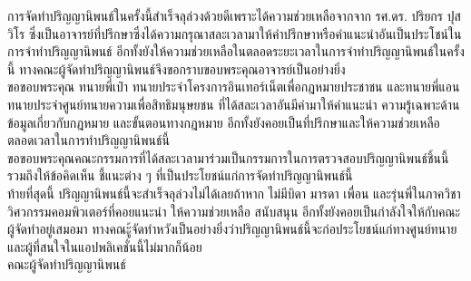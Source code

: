 \documentclass[12pt,oneside,openright,a4paper]{cpe-thai-project}
\begin{document}
\preface
\hspace*{1cm} การจัดทำปริญญานิพนธ์ในครั้งนี้สำเร็จลุล่วงด้วยดีเพราะได้ความช่วยเหลือจากจาก รศ.ดร. ปริยกร ปุสวิโร ซึ่งเป็นอาจารย์ที่ปรึกษาซึ่งได้ความกรุณาสละเวลามาให้คำปรึกษาหรือคำแนะนำอันเป็นประโชน์ในการจำทำปริญญานิพนธ์ อีกทั้งยังให้ความช่วยเหลือในตลอดระยะเวลาในการจำทำปริญญานิพนธ์ในครั้งนี้ ทางคณะผู้จัดทำปริญญานิพนธ์จึงขอกราบขอบพระคุณอาจารย์เป็นอย่างยิ่ง \\
\hspace*{1cm}ขอขอบพระคุณ ทนายพี่เป๋า ทนายประจำโครงการอินเทอร์เน็ตเพื่อกฎหมายประชาชน และทนายพี่แอน ทนายประจำศูนย์ทนายความเพื่อสิทธิมนุษยชน ที่ได้สละเวลาอันมีค่ามาให้คำแนะนำ ความรู้เฉพาะด้าน ข้อมูลเกี่ยวกับกฎหมาย และขั้นตอนทางกฎหมาย อีกทั้งยังคอยเป็นที่ปรึกษาและให้ความช่วยเหลือตลอดเวลาในการทำปริญญานิพนธ์นี้ \\
\hspace*{1cm}ขอขอบพระคุณคณะกรรมการที่ได้สละเวลามาร่วมเป็นกรรมการในการตรวจสอบปริญญานิพนธ์ชิ้นนี้ รวมถึงให้ข้อคิดเห็น ชี้แนะต่าง ๆ ที่เป็นประโยชน์แก่การจัดทำปริญญานิพนธ์นี้ \\
\hspace*{1cm}ท้ายที่สุดนี้ ปริญญานิพนธ์นี้จะสำเร็จลุล่วงไม่ได้เลยถ้าหาก ไม่มีบิดา มารดา เพื่อน และรุ่นพี่ในภาควิชาวิศวกรรมคอมพิวเตอร์ที่คอยแนะนำ ให้ความช่วยเหลือ สนับสนุน อีกทั้งยังคอยเป็นกำลังใจให้กับคณะผู้จัดทำอยู่เสมอมา ทางคณะู้จัดทำหวังเป็นอย่างยิ่งว่าปริญญานิพนธ์นี้จะก่อประโยชน์แก่ทางศูนย์ทนาย และผู้ที่สนใจในแอปพลิเคชั่นนี้ไม่มากก็น้อย \\
\hspace*{\fill} คณะผู้จัดทำปริญญานิพนธ์

\tableofcontents                    
\listoftables
\listoffigures                      
\end{document}
